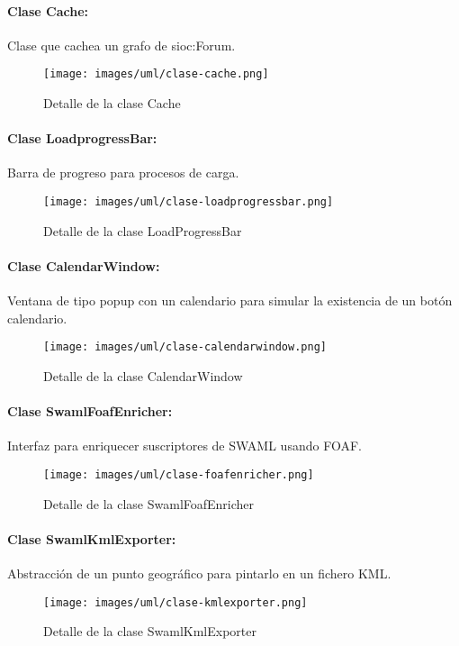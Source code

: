 \paragraph{Clase Cache:}

Clase que cachea un grafo de sioc:Forum.

\begin{figure}[H]
	\centering
 	\texttt{[image: images/uml/clase-cache.png]}
	\caption{Detalle de la clase Cache}
	\label{fig:uml:cache-class}
\end{figure}

\paragraph{Clase LoadprogressBar:}

Barra de progreso para procesos de carga.

\begin{figure}[H]
	\centering
 	\texttt{[image: images/uml/clase-loadprogressbar.png]}
	\caption{Detalle de la clase LoadProgressBar}
	\label{fig:uml:loadprogressbar-class}
\end{figure}

\paragraph{Clase CalendarWindow:}

Ventana de tipo popup con un calendario para simular la existencia de un
botón calendario.

\begin{figure}[H]
	\centering
 	\texttt{[image: images/uml/clase-calendarwindow.png]}
	\caption{Detalle de la clase CalendarWindow}
	\label{fig:uml:calenarwindow-class}
\end{figure}

\paragraph{Clase SwamlFoafEnricher:}

Interfaz para enriquecer suscriptores de SWAML usando FOAF.

\begin{figure}[H]
	\centering
 	\texttt{[image: images/uml/clase-foafenricher.png]}
	\caption{Detalle de la clase SwamlFoafEnricher}
	\label{fig:uml:swamlfoafenricher-class}
\end{figure}

\paragraph{Clase SwamlKmlExporter:}

Abstracción de un punto geográfico para pintarlo en un fichero KML.

\begin{figure}[H]
	\centering
 	\texttt{[image: images/uml/clase-kmlexporter.png]}
	\caption{Detalle de la clase SwamlKmlExporter}
	\label{fig:uml:swamlkmlexporter-class}
\end{figure}
